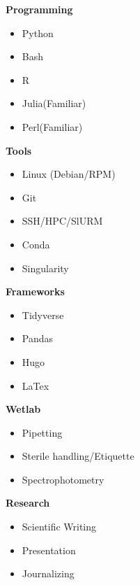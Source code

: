 \documentclass[]{CustomCV}
\begin{document}
\begin{multicols}{5}
    \textbf{Programming}
    \begin{itemize}
        \item Python
        \item Bash
        \item R
        \item Julia(Familiar)
        \item Perl(Familiar)
    \end{itemize}
    \columnbreak
    \textbf{Tools}
    \begin{itemize}
        \item Linux (Debian/RPM)
        \item Git
        \item SSH/HPC/SlURM
        \item Conda
        \item Singularity
    \end{itemize}
    \columnbreak
    \textbf{Frameworks}
    \begin{itemize}
        \item Tidyverse
        \item Pandas
        \item Hugo
        \item LaTex
    \end{itemize}
    \columnbreak
    \textbf{Wetlab}
    \begin{itemize}
        \item Pipetting
        \item Sterile handling/Etiquette
        \item Spectrophotometry
    \end{itemize}
    \columnbreak
    \textbf{Research}
    \begin{itemize}
        \item Scientific Writing
        \item Presentation
        \item Journalizing
    \end{itemize}
\end{multicols}
\end{document}
